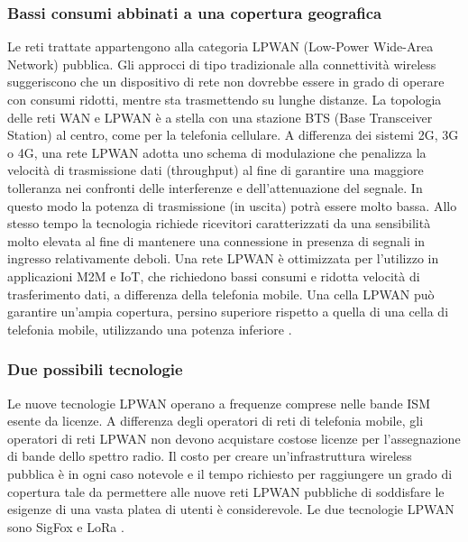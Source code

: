 \documentclass[a4paper]{report} %
\begin{document}
\subsubsection{Bassi consumi abbinati a una copertura geografica}
Le reti trattate appartengono alla categoria LPWAN (Low-Power Wide-Area Network) pubblica. Gli approcci di tipo tradizionale alla connettività wireless suggeriscono che un dispositivo di rete non dovrebbe essere in grado di operare con consumi ridotti, mentre sta trasmettendo su lunghe distanze. La topologia delle reti WAN e LPWAN è a stella con una stazione BTS (Base Transceiver Station) al centro, come per la telefonia cellulare. A differenza dei sistemi 2G, 3G o 4G, una rete LPWAN adotta uno schema di modulazione che penalizza la velocità di trasmissione dati (throughput) al fine di garantire una maggiore tolleranza nei confronti delle interferenze e dell'attenuazione del segnale. In questo modo la potenza di trasmissione (in uscita) potrà essere molto bassa. Allo stesso tempo la tecnologia richiede ricevitori caratterizzati da una sensibilità molto elevata al fine di mantenere una connessione in presenza di segnali in ingresso relativamente deboli. Una rete LPWAN è ottimizzata per l'utilizzo in applicazioni M2M e IoT, che richiedono bassi consumi e ridotta velocità di trasferimento dati, a differenza della telefonia mobile. Una cella LPWAN può garantire un'ampia copertura, persino superiore rispetto a quella di una cella di telefonia mobile, utilizzando una potenza inferiore \cite{art:rif.23}.

\subsubsection{Due possibili tecnologie}
Le nuove tecnologie LPWAN operano a frequenze comprese nelle bande ISM esente da licenze. A differenza degli operatori di reti di telefonia mobile, gli operatori di reti LPWAN non devono acquistare costose licenze per l'assegnazione di bande dello spettro radio. Il costo per creare un'infrastruttura wireless pubblica è in ogni caso notevole e il tempo richiesto per raggiungere un grado di copertura tale da permettere alle nuove reti LPWAN pubbliche di soddisfare le esigenze di una vasta platea di utenti è considerevole. Le due tecnologie LPWAN sono SigFox e LoRa \cite{art:rif.23}. %
\end{document}
